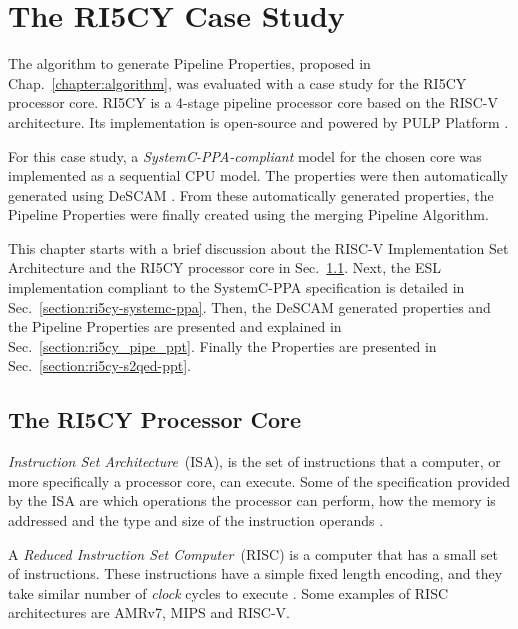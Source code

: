\chapter{The RI5CY Case Study}
\label{chapter:ri5cy}

The algorithm to generate Pipeline Properties, proposed in Chap.~\ref{chapter:algorithm},  was evaluated with a case study for the RI5CY processor core. RI5CY is a 4-stage pipeline processor core based on the RISC-V architecture. Its implementation is open-source and powered by PULP Platform \cite{pulp}.

For this case study, a \textit{SystemC-PPA-compliant} \cite{paper-pdd} model for the chosen core was implemented as a sequential CPU model. The properties were then automatically generated using DeSCAM \cite{descam}. From these automatically generated properties, the Pipeline Properties were finally created using the merging Pipeline Algorithm. 

This chapter starts with a brief discussion about the RISC-V Implementation Set Architecture and the RI5CY processor core in Sec.~\ref{section:ri5cy_core}. Next, the ESL implementation compliant to the SystemC-PPA specification is detailed in Sec.~\ref{section:ri5cy-systemc-ppa}. Then, the DeSCAM generated properties and the Pipeline Properties are presented and explained in Sec.~\ref{section:ri5cy_pipe_ppt}. Finally the \SSQED{} Properties are presented in Sec.~\ref{section:ri5cy-s2qed-ppt}.

\section{The RI5CY Processor Core}
\label{section:ri5cy_core}

\textit{Instruction Set Architecture}~(ISA), is the set of instructions that a computer, or more specifically a processor core, can execute. Some of the specification provided by the ISA are which operations the processor can perform, how the memory is addressed and the type and size of the instruction operands \cite{book-comp-arch}.

A \textit{Reduced Instruction Set Computer}~(RISC) is a computer that has a small set of instructions. These instructions have a simple fixed length encoding, and they take similar number of \textit{clock} cycles to execute \cite{book-comp-arch}. Some examples of RISC architectures are AMRv7, MIPS and RISC-V.

